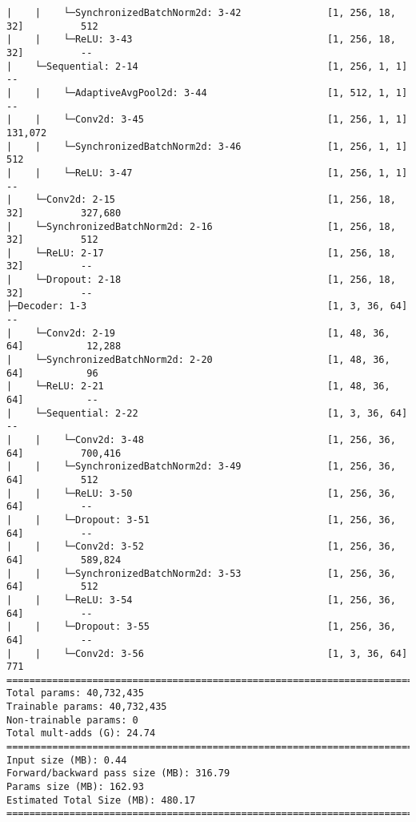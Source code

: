 \begin{verbatim}
|    |    └─SynchronizedBatchNorm2d: 3-42               [1, 256, 18, 32]          512
|    |    └─ReLU: 3-43                                  [1, 256, 18, 32]          --
|    └─Sequential: 2-14                                 [1, 256, 1, 1]            --
|    |    └─AdaptiveAvgPool2d: 3-44                     [1, 512, 1, 1]            --
|    |    └─Conv2d: 3-45                                [1, 256, 1, 1]            131,072
|    |    └─SynchronizedBatchNorm2d: 3-46               [1, 256, 1, 1]            512
|    |    └─ReLU: 3-47                                  [1, 256, 1, 1]            --
|    └─Conv2d: 2-15                                     [1, 256, 18, 32]          327,680
|    └─SynchronizedBatchNorm2d: 2-16                    [1, 256, 18, 32]          512
|    └─ReLU: 2-17                                       [1, 256, 18, 32]          --
|    └─Dropout: 2-18                                    [1, 256, 18, 32]          --
├─Decoder: 1-3                                          [1, 3, 36, 64]            --
|    └─Conv2d: 2-19                                     [1, 48, 36, 64]           12,288
|    └─SynchronizedBatchNorm2d: 2-20                    [1, 48, 36, 64]           96
|    └─ReLU: 2-21                                       [1, 48, 36, 64]           --
|    └─Sequential: 2-22                                 [1, 3, 36, 64]            --
|    |    └─Conv2d: 3-48                                [1, 256, 36, 64]          700,416
|    |    └─SynchronizedBatchNorm2d: 3-49               [1, 256, 36, 64]          512
|    |    └─ReLU: 3-50                                  [1, 256, 36, 64]          --
|    |    └─Dropout: 3-51                               [1, 256, 36, 64]          --
|    |    └─Conv2d: 3-52                                [1, 256, 36, 64]          589,824
|    |    └─SynchronizedBatchNorm2d: 3-53               [1, 256, 36, 64]          512
|    |    └─ReLU: 3-54                                  [1, 256, 36, 64]          --
|    |    └─Dropout: 3-55                               [1, 256, 36, 64]          --
|    |    └─Conv2d: 3-56                                [1, 3, 36, 64]            771
=========================================================================================================
Total params: 40,732,435
Trainable params: 40,732,435
Non-trainable params: 0
Total mult-adds (G): 24.74
=========================================================================================================
Input size (MB): 0.44
Forward/backward pass size (MB): 316.79
Params size (MB): 162.93
Estimated Total Size (MB): 480.17
=========================================================================================================

\end{verbatim}

